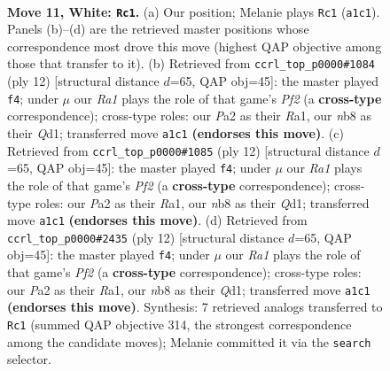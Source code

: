 \documentclass[11pt]{article}
\begin{document}
\clearpage

\begin{figure}[p]\centering
\begin{subfigure}{0.46\textwidth}\centering
\resizebox{\linewidth}{!}{%
\newchessgame
\chessboard[
  setfen={rnbq1rk1/pppn1ppp/4p3/3pP3/3P1P2/2N2Q2/PPP3PP/R3KBNR w KQ - 7 11},
  showmover=false,
  pgfstyle=straightmove, color=movearrow, markmove={a1-c1}
]}
\caption{}
\end{subfigure}\hfill
\begin{subfigure}{0.46\textwidth}\centering
\resizebox{\linewidth}{!}{%
\newchessgame
\chessboard[
  setfen={rnb1k2r/pppnqppp/4p3/3pP3/3P4/2N5/PPP2PPP/R2QKBNR w KQkq - 0 7},
  showmover=false,
  pgfstyle=straightmove, color=movearrow, markmove={f2-f4}
]}
\caption{}
\end{subfigure}
\\[4pt]
\begin{subfigure}{0.46\textwidth}\centering
\resizebox{\linewidth}{!}{%
\newchessgame
\chessboard[
  setfen={rnb1k2r/pppnqppp/4p3/3pP3/3P4/2N5/PPP2PPP/R2QKBNR w KQkq - 0 7},
  showmover=false,
  pgfstyle=straightmove, color=movearrow, markmove={f2-f4}
]}
\caption{}
\end{subfigure}\hfill
\begin{subfigure}{0.46\textwidth}\centering
\resizebox{\linewidth}{!}{%
\newchessgame
\chessboard[
  setfen={rnb1k2r/pppnqppp/4p3/3pP3/3P4/2N5/PPP2PPP/R2QKBNR w KQkq - 0 7},
  showmover=false,
  pgfstyle=straightmove, color=movearrow, markmove={f2-f4}
]}
\caption{}
\end{subfigure}
\caption{\textbf{Move 11, White: \texttt{Rc1}.} (a) Our position; Melanie plays \texttt{Rc1} (\texttt{a1c1}). Panels (b)--(d) are the retrieved master positions whose correspondence most drove this move (highest QAP objective among those that transfer to it). (b) Retrieved from \texttt{ccrl\_top\_p0000\#1084} (ply 12) [structural distance $d$=65, QAP obj=45]: the master played \texttt{f4}; under $\mu$ our \emph{Ra1} plays the role of that game's \emph{Pf2} (a \textbf{cross-type} correspondence); cross-type roles: our \emph{P}a2 as their \emph{R}a1, our \emph{n}b8 as their \emph{Q}d1; transferred move \texttt{a1c1} \textbf{(endorses this move)}. (c) Retrieved from \texttt{ccrl\_top\_p0000\#1085} (ply 12) [structural distance $d$=65, QAP obj=45]: the master played \texttt{f4}; under $\mu$ our \emph{Ra1} plays the role of that game's \emph{Pf2} (a \textbf{cross-type} correspondence); cross-type roles: our \emph{P}a2 as their \emph{R}a1, our \emph{n}b8 as their \emph{Q}d1; transferred move \texttt{a1c1} \textbf{(endorses this move)}. (d) Retrieved from \texttt{ccrl\_top\_p0000\#2435} (ply 12) [structural distance $d$=65, QAP obj=45]: the master played \texttt{f4}; under $\mu$ our \emph{Ra1} plays the role of that game's \emph{Pf2} (a \textbf{cross-type} correspondence); cross-type roles: our \emph{P}a2 as their \emph{R}a1, our \emph{n}b8 as their \emph{Q}d1; transferred move \texttt{a1c1} \textbf{(endorses this move)}. Synthesis: 7 retrieved analogs transferred to \texttt{Rc1} (summed QAP objective 314, the strongest correspondence among the candidate moves); Melanie committed it via the \texttt{search} selector.}
\label{fig:thought-m20}
\end{figure}
\end{document}
